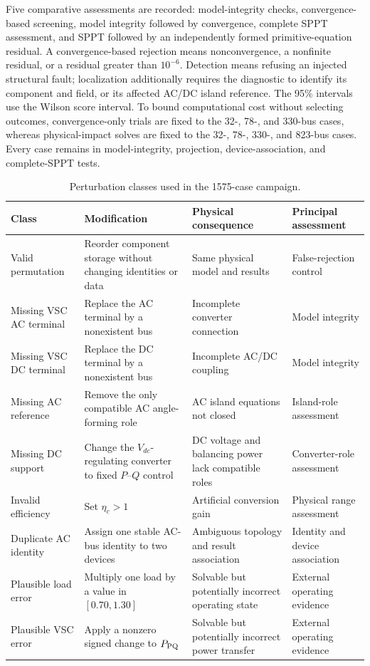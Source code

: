 Five comparative assessments are recorded: model-integrity checks,
convergence-based screening, model integrity followed by convergence, complete
SPPT assessment, and SPPT followed by an independently formed primitive-equation
residual. A convergence-based rejection means nonconvergence, a nonfinite
residual, or a residual greater than $10^{-6}$.
Detection means refusing an injected structural fault; localization additionally
requires the diagnostic to identify its component and field, or its affected
AC/DC island reference. The 95\% intervals use the Wilson score interval. To
bound computational cost without selecting outcomes, convergence-only
trials are fixed to the 32-, 78-, and 330-bus cases, whereas physical-impact
solves are fixed to the 32-, 78-, 330-, and 823-bus cases. Every case remains in
model-integrity, projection, device-association, and complete-SPPT tests.

\begin{table}[t]
\centering
\caption{Perturbation classes used in the 1575-case campaign.}
\label{tab:fault-classes}
\small
\begin{tabularx}{\textwidth}{@{}p{}p{}p{}X@{}}
\toprule
Class & Modification & Physical consequence & Principal assessment\\
\midrule
Valid permutation & Reorder component storage without changing identities or data & Same physical model and results & False-rejection control\\
Missing VSC AC terminal & Replace the AC terminal by a nonexistent bus & Incomplete converter connection & Model integrity\\
Missing VSC DC terminal & Replace the DC terminal by a nonexistent bus & Incomplete AC/DC coupling & Model integrity\\
Missing AC reference & Remove the only compatible AC angle-forming role & AC island equations not closed & Island-role assessment\\
Missing DC support & Change the $V_{dc}$-regulating converter to fixed $P$--$Q$ control & DC voltage and balancing power lack compatible roles & Converter-role assessment\\
Invalid efficiency & Set $\eta_c>1$ & Artificial conversion gain & Physical range assessment\\
Duplicate AC identity & Assign one stable AC-bus identity to two devices & Ambiguous topology and result association & Identity and device association\\
Plausible load error & Multiply one load by a value in $[0.70,1.30]$ & Solvable but potentially incorrect operating state & External operating evidence\\
Plausible VSC error & Apply a nonzero signed change to $P_{\rm PQ}$ & Solvable but potentially incorrect power transfer & External operating evidence\\
\bottomrule
\end{tabularx}
\end{table}


